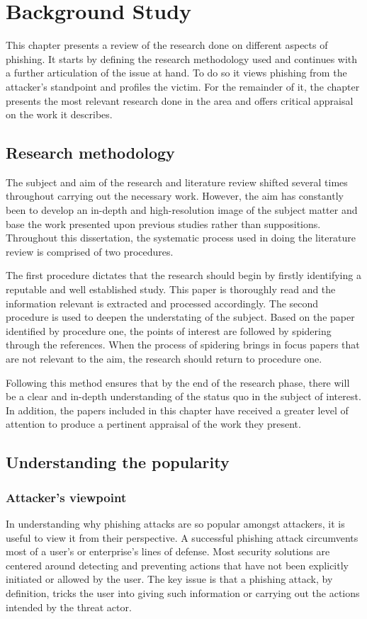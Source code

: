\raggedbottom
\chapter{Background Study}
\label{chap:bgStudy}
This chapter presents a review of the research done on different aspects of
phishing. It starts by defining the research methodology used and continues with a further articulation of the issue at hand. To do so it views phishing from the attacker's standpoint and profiles the victim. For the remainder of it, the chapter presents the most relevant research done in the area and offers critical appraisal on the work it describes.

\section{Research methodology}
The subject and aim of the research and literature review shifted several times throughout carrying out the necessary work. However, the aim has constantly been to develop an in-depth and high-resolution image of the subject matter and base the work presented upon previous studies rather than suppositions. Throughout this dissertation, the systematic process used in doing the literature review is comprised of two procedures.

The first procedure dictates that the research should begin by firstly identifying a reputable and well established study. This paper is thoroughly read and the information relevant is extracted and processed accordingly.
The second procedure is used to deepen the understating of the subject. Based on the paper identified by procedure one, the points of interest are followed by spidering through the references. When the process of spidering brings in focus papers that are not relevant to the aim, the research should return to procedure one.

Following this method ensures that by the end of the research phase, there will be a clear and in-depth understanding of the status quo in the subject of interest. In addition, the papers included in this chapter have received a greater level of attention to produce a pertinent appraisal of the work they present.


\section{Understanding the popularity}

\subsection{Attacker's viewpoint}
In understanding why phishing attacks are so popular amongst attackers, it is
useful to view it from their perspective. A successful phishing attack circumvents most of a user's or enterprise's lines of defense. Most security
solutions are centered around detecting and preventing actions that have not
been explicitly initiated or allowed by the user. The key issue is that a
phishing attack, by definition, tricks the user into giving such information or
carrying out the actions intended by the threat actor.

